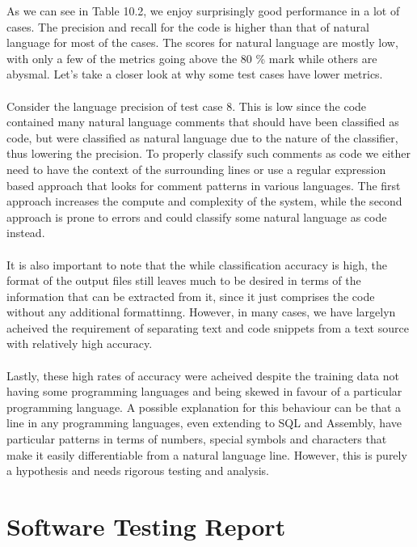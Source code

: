 \documentclass[12pt]{scrreprt}
\begin{document}
As we can see in Table 10.2, we enjoy surprisingly good performance in a lot of cases. The precision and recall for the code is higher than that of natural language for most of the cases. The scores for natural language are mostly low, with only a few of the metrics going above the 80 \% mark while others are abysmal. Let's take a closer look at why some test cases have lower metrics. \\ 
\\ Consider the language precision of test case 8. This is low since the code contained many natural language comments that should have been classified as code, but were classified as natural language due to the nature of the classifier, thus lowering the precision. To properly classify such comments as code we either need to have the context of the surrounding lines or use a regular expression based approach that looks for comment patterns in various languages. The first approach increases the compute and complexity of the system, while the second approach is prone to errors and could classify some natural language as code instead.\\
\\ It is also important to note that the while classification accuracy is high, the format of the output files still leaves much to be desired in terms of the information that can be extracted from it, since it just comprises the code without any additional formattinng. However, in many cases, we have largelyn acheived the requirement of separating text and code snippets from a text source with relatively high accuracy.\\
\\ Lastly, these high rates of accuracy were acheived despite the training data not having some programming languages and being skewed in favour of a particular programming language. A possible explanation for this behaviour can be that a line in any programming languages, even extending to SQL and Assembly, have particular patterns in terms of numbers, special symbols and characters that make it easily differentiable from a natural language line. However, this is purely a hypothesis and needs rigorous testing and analysis.





\section{Software Testing Report}
\end{document}

